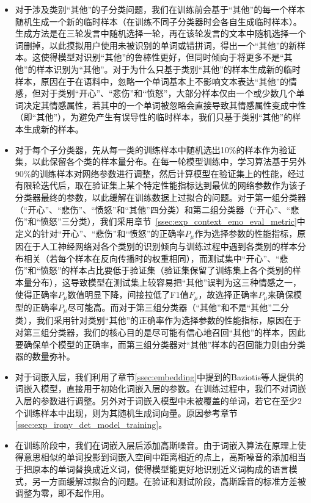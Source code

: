 \begin{itemize}

\item 对于涉及类别“其他”的子分类问题，我们在训练前会基于“其他”的每一个样本随机生成一个新的临时样本（在训练不同子分类器时会各自生成临时样本）。生成方法是在三轮发言中随机选择一轮，再在该轮发言的文本中随机选择一个词删掉，以此摸拟用户使用未被识别的单词或错拼词，得出一个“其他”的新样本。这使得模型对识别“其他”的鲁棒性更好，但同时倾向于将更多不是“其他”的样本识别为“其他”。对于为什么只基于类别“其他”的样本生成新的临时样本，原因在于在语料中，忽略一个单词基本上不影响文本表达“其他”的情感，但对于类别“开心”、“悲伤”和“愤怒”，大部分样本仅由一个或少数几个单词决定其情感属性，若其中的一个单词被忽略会直接导致其情感属性变成中性（即“其他”），为避免产生有误导性的临时样本，我们只基于类别“其他”的样本生成新的样本。

\item 对于每个子分类器，先从每一类的训练样本中随机选出10\%的样本作为验证集，以此保留各个类的样本量分布。在每一轮模型训练中，学习算法基于另外90\%的训练样本对网络参数进行调整，然后计算模型在验证集上的性能，经过有限轮迭代后，取在验证集上某个特定性能指标达到最优的网络参数作为该子分类器最终的参数，以此缓解在训练数据上过拟合的问题。对于第一组分类器（“开心”、“悲伤”、“愤怒”和“其他”四分类）和第二组分类器（“开心”、“悲伤”和“愤怒”三分类），我们采用章节~\ref{ssec:exp_context_emo_eval_metric}中定义的针对“开心”、“悲伤”和“愤怒”的正确率$P_\mu$作为选择参数的性能指标，原因在于人工神经网络对各个类别的识别倾向与训练过程中遇到各类别的样本分布相关（若每个样本在反向传播时的权重相同），而测试集中“开心”、“悲伤”和“愤怒”的样本占比要低于验证集（验证集保留了训练集上各个类别的样本量分布），这导致模型在测试集上较容易把“其他”误判为这三种情感之一，使得正确率$P_\mu$数值明显下降，间接拉低了F1值$F_\mu$，故选择正确率$P_\mu$来确保模型的正确率$P_\mu$尽可能高。而对于第三组分类器（“其他”和不是“其他”二分类），我们采用针对类别“其他”的正确率作为选择参数的性能指标，原因在于对第三组分类器，我们的核心目的是尽可能有信心地召回“其他”的样本，因此要确保单个模型的正确率，而第三组分类器对“其他”样本的召回能力则由分类器的数量弥补。

\item 对于词嵌入层，我们利用了章节\ref{ssec:embedding}中提到的Baziotis等人\cite{baziotis2018ntua}提供的词嵌入模型，直接用于初始化词嵌入层的参数。在训练过程中，我们不对词嵌入层的参数进行调整。另外对于词嵌入模型中未被覆盖的单词，若它在至少2个训练样本中出现，则为其随机生成词向量。原因参考章节\ref{ssec:exp_irony_det_model_training}。

\item 在训练阶段中，我们在词嵌入层后添加高斯噪音。由于词嵌入算法在原理上使得意思相似的单词投影到词嵌入空间中距离相近的点上，高斯噪音的添加相当于把原本的单词替换成近义词，使得模型能更好地识别近义词构成的语言模式，另一方面缓解过拟合的问题。在验证和测试阶段，高斯躁音的标准方差被调整为零，即不起作用。


\end{itemize}
